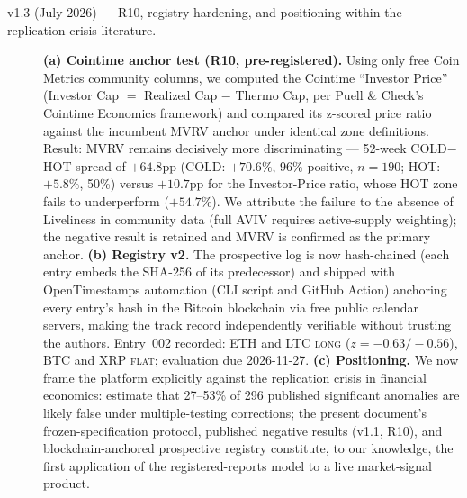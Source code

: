 \documentclass[11pt,a4paper]{article}
\begin{document}
\begin{description}
\item[v1.3 (July 2026) --- R10, registry hardening, and positioning within the replication-crisis literature.] \textbf{(a) Cointime anchor test (R10, pre-registered).} Using only free Coin Metrics community columns, we computed the Cointime ``Investor Price'' (Investor Cap $=$ Realized Cap $-$ Thermo Cap, per Puell \& Check's Cointime Economics framework) and compared its z-scored price ratio against the incumbent MVRV anchor under identical zone definitions. Result: MVRV remains decisively more discriminating --- 52-week COLD$-$HOT spread of $+64.8$pp (COLD: $+70.6\%$, 96\% positive, $n{=}190$; HOT: $+5.8\%$, 50\%) versus $+10.7$pp for the Investor-Price ratio, whose HOT zone fails to underperform ($+54.7\%$). We attribute the failure to the absence of Liveliness in community data (full AVIV requires active-supply weighting); the negative result is retained and MVRV is confirmed as the primary anchor. \textbf{(b) Registry v2.} The prospective log is now hash-chained (each entry embeds the SHA-256 of its predecessor) and shipped with OpenTimestamps automation (CLI script and GitHub Action) anchoring every entry's hash in the Bitcoin blockchain via free public calendar servers, making the track record independently verifiable without trusting the authors. Entry~002 recorded: ETH and LTC \textsc{long} ($z{=}-0.63/-0.56$), BTC and XRP \textsc{flat}; evaluation due 2026-11-27. \textbf{(c) Positioning.} We now frame the platform explicitly against the replication crisis in financial economics: \citet{harvey2016and} estimate that 27--53\% of 296 published significant anomalies are likely false under multiple-testing corrections; the present document's frozen-specification protocol, published negative results (v1.1, R10), and blockchain-anchored prospective registry constitute, to our knowledge, the first application of the registered-reports model to a live market-signal product.
\end{description}
\end{document}
